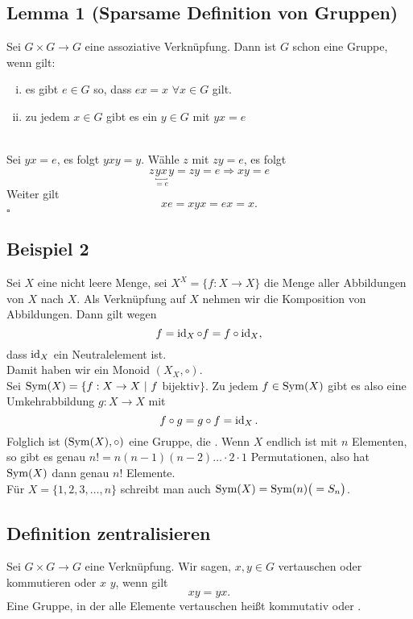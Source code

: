 \subsection{Lemma 1 (Sparsame Definition von Gruppen)}
\label{sub:lemma_1}
Sei $G \times G \to G$ eine assoziative Verknüpfung. 
Dann ist $G$ schon eine Gruppe, wenn gilt:
\begin{enumerate}[(i)]
	\item es gibt $e \in G$ so, dass $ex=x$ $\forall x \in G$ gilt.
	\item zu jedem $x\in G$ gibt es ein $y \in G$ mit $ yx=e$
\end{enumerate}
\\
Sei $yx=e$, es folgt $yxy=y$. 
Wähle $z$ mit $zy=e$, es folgt 
\[
z\underbracket{yx}_{=e}y=zy=e \Rightarrow xy=e
\]
Weiter gilt 
\[
xe=xyx=ex=x.
\]
\hfill $\square$

\subsection{Beispiel 2}
\label{sub: beispiel_2}
Sei $X$ eine nicht leere Menge, sei $X^X=\{f : X \to X\}$ die Menge aller Abbildungen von $X$ nach $X$. 
Als Verknüpfung auf $X$ nehmen wir die Komposition von Abbildungen. 
Dann gilt wegen 
\[
f=\operatorname{id}_X \circ f= f \circ \operatorname{id}_X,
\] 
dass $\operatorname{id}_X$ ein Neutralelement ist.\\
Damit haben wir ein Monoid $(X_X, \circ )$.\\
Sei $\operatorname{Sym}(X)=\{f:X\to X~|~f$ bijektiv$\}$. 
Zu jedem $f\in \operatorname{Sym}(X)$ gibt es also eine Umkehrabbildung $g:X\to X$ mit
\[
f \circ g=g\circ f=\operatorname{id}_X.
\]
Folglich ist $(\operatorname{Sym}(X), \circ)$ eine Gruppe, die . 
Wenn $X$ endlich ist mit $n$ Elementen, so gibt es genau $n!=n(n-1)(n-2)\dots \cdot 2\cdot 1$ Permutationen, also hat $\operatorname{Sym}(X)$ dann genau $n!$ Elemente.\\
Für $X=\{1,2,3,\dots,n\}$ schreibt man auch $\operatorname{Sym}(X)=\operatorname{Sym}(n)\big( =S_n \big)$.

\subsection{Definition zentralisieren}
\label{sub:def_zentralisieren}
Sei $G \times G \to G$ eine Verknüpfung. 
Wir sagen, $x,y \in G$ vertauschen oder kommutieren oder $x$  $y$, wenn gilt 
\[
xy=yx.
\]
Eine Gruppe, in der alle Elemente vertauschen heißt kommutativ oder . 

